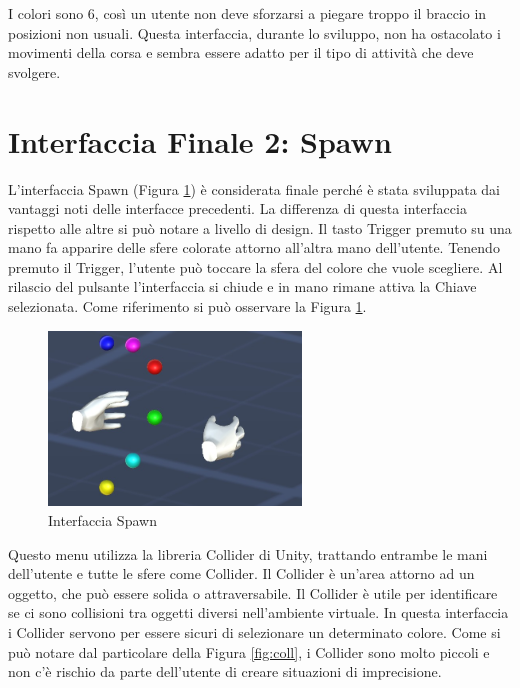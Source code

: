 \documentclass[target=bach,aauheader=]{thud}
\begin{document}
I colori sono 6, così un utente non deve sforzarsi a piegare troppo il braccio in posizioni non usuali.
Questa interfaccia, durante lo sviluppo, non ha ostacolato i movimenti della corsa e sembra essere adatto per il tipo di attività che deve svolgere. 

\section{Interfaccia Finale 2: Spawn} %
\label{int_spawn}
L'interfaccia Spawn (Figura \ref{fig:spawn}) è considerata finale perché è stata sviluppata dai vantaggi noti delle interfacce precedenti.
La differenza di questa interfaccia rispetto alle altre si può notare a livello di design.
Il tasto Trigger premuto su una mano fa apparire delle sfere colorate attorno all'altra mano dell'utente.
Tenendo premuto il Trigger, l'utente può toccare la sfera del colore che vuole scegliere.
Al rilascio del pulsante l'interfaccia si chiude e in mano rimane attiva la Chiave selezionata. 
Come riferimento si può osservare la Figura \ref{fig:spawn}. \\

\begin{figure}[h]
    \centering
    \includegraphics[width=0.60\textwidth]{spawn}
    \caption{Interfaccia Spawn}
    \label{fig:spawn}
\end{figure}

Questo menu utilizza la libreria Collider di Unity, trattando entrambe le mani dell'utente e tutte le sfere come Collider.
Il Collider è un'area attorno ad un oggetto, che può essere solida o attraversabile.
Il Collider è utile per identificare se ci sono collisioni tra oggetti diversi nell'ambiente virtuale.
In questa interfaccia i Collider servono per essere sicuri di selezionare un determinato colore.
Come si può notare dal particolare della Figura \ref{fig:coll}, i Collider sono molto piccoli e non c'è rischio da parte dell'utente di creare situazioni di imprecisione. \\
\end{document}
